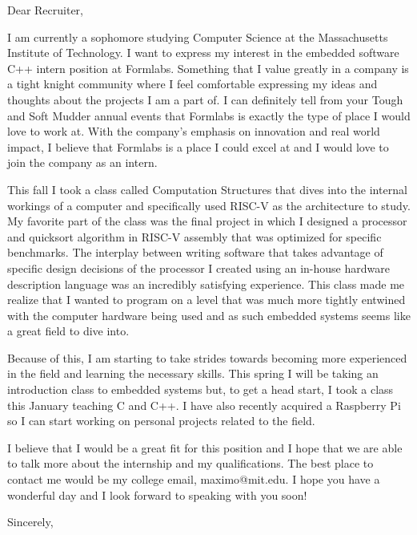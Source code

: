 \documentclass[12pt]{letter}
\begin{document}
\begin{letter}{}
    \opening{Dear Recruiter,}
    I am currently a sophomore studying Computer Science at the Massachusetts Institute of Technology.
    I want to express my interest in the embedded software C++ intern position at Formlabs.
    Something that I value greatly in a company is a tight knight community where I feel comfortable expressing my ideas and thoughts about the projects I am a part of.
    I can definitely tell from your Tough and Soft Mudder annual events that Formlabs is exactly the type of place I would love to work at.
    With the company's emphasis on innovation and real world impact, I believe that Formlabs is a place I could excel at and I would love to join the company as an intern.

    This fall I took a class called Computation Structures that dives into the internal workings of a computer and specifically used RISC-V as the architecture to study.
    My favorite part of the class was the final project in which I designed a processor and quicksort algorithm in RISC-V assembly that was optimized for specific benchmarks.
    The interplay between writing software that takes advantage of specific design decisions of the processor I created using an in-house hardware description language was an incredibly satisfying experience.
    This class made me realize that I wanted to program on a level that was much more tightly entwined with the computer hardware being used and as such embedded systems seems like a great field to dive into.

    Because of this, I am starting to take strides towards becoming more experienced in the field and learning the necessary skills.
    This spring I will be taking an introduction class to embedded systems but, to get a head start, I took a class this January teaching C and C++.
    I have also recently acquired a Raspberry Pi so I can start working on personal projects related to the field.

    I believe that I would be a great fit for this position and I hope that we are able to talk more about the internship and my qualifications.
    The best place to contact me would be my college email, maximo@mit.edu. I hope you have a wonderful day and I look forward to speaking with you soon!
    \closing{Sincerely,}
\end{letter}
\end{document}
